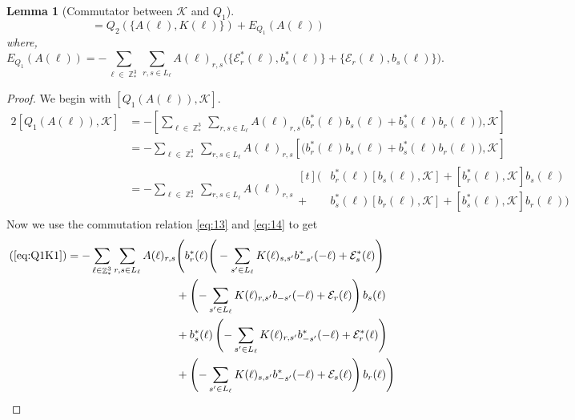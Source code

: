 \documentclass[sn-mathphys,Numbered, a4paper ,nocrop]{sn-jnl}%
\DeclareMathOperator{\Z}{\mathbb{Z}}
\theoremstyle{plain}
\newtheorem{lemma}[theorem]{Lemma}
\theoremstyle{definition}
\theoremstyle{remark}
\theoremstyle{plain}
\theoremstyle{definition}
\theoremstyle{remark}
\begin{document}
\begin{lemma}[Commutator between $\mathcal{K} $ and $Q_1$]
    \begin{equation}
        [ Q_1(A(\ell)),\mathcal{K}] = Q_2(\{A(\ell),K(\ell)\}) + E_{Q_1}(A(\ell))
    \end{equation}
 where,
 \begin{equation}
     E_{Q_1}(A(\ell))=-\sum\limits_{\ell \in \Z^3_*}\sum\limits_{r,s \in L_{\ell}}A(\ell)_{r,s}\Big(\big\{\mathcal{E}^*_{r}(\ell),b^*_{s}(\ell)\big\} + \big\{\mathcal{E}_{r}(\ell),b_{s}(\ell)\big\}\Big). 
 \end{equation}
\end{lemma}
\begin{proof}We begin with $[ Q_1(A(\ell)),\mathcal{K}]$.
    \begin{alignat}{2}
        [ Q_1(A(\ell)),\mathcal{K}] &= -\left[\sum\limits_{\ell \in \Z^3_*}\sum\limits_{r,s \in L_{\ell}}A(\ell)_{r,s}\Big(b^*_{r}(\ell)b_{s}(\ell) + b^*_{s}(\ell)b_{r}(\ell)\Big),\mathcal{K}\right]\\
        &=-\sum\limits_{\ell \in \Z^3_*}\sum\limits_{r,s \in L_{\ell}}A(\ell)_{r,s}\left[\Big(b^*_{r}(\ell)b_{s}(\ell) + b^*_{s}(\ell)b_{r}(\ell)\Big),\mathcal{K}\right]\\
        &=-\sum\limits_{\ell \in \Z^3_*}\sum\limits_{r,s \in L_{\ell}}A(\ell)_{r,s}\begin{aligned}[t]
            \Big(&b^*_{r}(\ell)\left[b_{s}(\ell),\mathcal{K}\right] +\left[b^*_{r}(\ell),\mathcal{K}\right]b_{s}(\ell)\\ + &b^*_{s}(\ell)\left[b_{r}(\ell),\mathcal{K}\right]+ \left[b^*_{s}(\ell),\mathcal{K}\right]b_{r}(\ell)\Big)
        \end{aligned}\label{eq:Q1K1}
    \end{alignat}
    Now we use the commutation relation \eqref{eq:13} and \eqref{eq:14} to get
\begin{alignat}{2}
    (\ref{eq:Q1K1})&=-\sum\limits_{\ell \in \Z^3_*}\sum\limits_{r,s \in L_{\ell}}A(\ell)_{r,s}\begin{aligned}[t]
        &\Bigg(b^*_{r}(\ell)\Bigg(-\sum\limits_{s'\in L_{\ell}}K(\ell)_{s,s'}b^*_{-s'}(-\ell) + \mathcal{E}^*_{s}(\ell)\Bigg)\\ &+ \left(-\sum\limits_{s'\in L_{\ell}}K(\ell)_{r,s'}b_{-s'}(-\ell) + \mathcal{E}_{r}(\ell)\right)b_{s}(\ell)\\&+ b^*_{s}(\ell)\left(-\sum\limits_{s'\in L_{\ell}}K(\ell)_{r,s'}b^*_{-s'}(-\ell) + \mathcal{E}^*_{r}(\ell)\right)\\ &+ \left(-\sum\limits_{s'\in L_{\ell}}K(\ell)_{s,s'}b^*_{-s'}(-\ell) + \mathcal{E}_{s}(\ell)\right)b_{r}(\ell) \Bigg)        

\end{aligned}
\end{alignat}
\end{proof}
\end{document}
